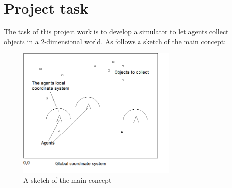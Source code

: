 \documentclass[10pt,a4paper,DIV=11]{scrreprt}
\begin{document}




\section{Project task}
The task of this project work is to develop a simulator to let agents collect objects in a 2-dimensional world. As follows a sketch of the main concept: \\

\begin{center}
	\begin{figure}[H]
		\centering
		\includegraphics[width=0.7\textwidth,scale=1.0]{files/main-concept.png}  
		\caption{A sketch of the main concept}
		\label{fig:concept-main-intro}
	\end{figure}
\end{center}
\end{document}
